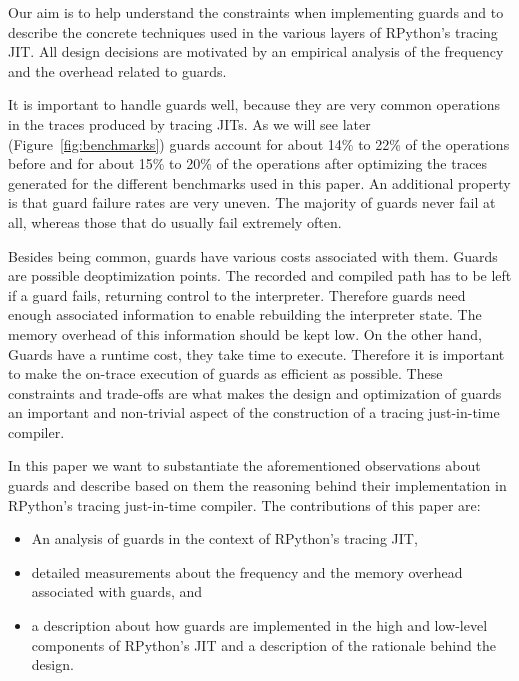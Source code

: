 \documentclass[10pt,preprint]{sigplanconf}
\begin{document}
Our aim is to help understand the constraints when implementing guards
and to describe the concrete techniques used in the various layers of RPython's
tracing JIT. All design decisions are motivated by an empirical analysis of the
frequency and the overhead related to guards.

It is important to handle guards well, because they are very common operations
in the traces produced by tracing JITs. As we will see later (Figure~\ref{fig:benchmarks})
guards account for about 14\% to 22\% of the
operations before and for about 15\% to 20\% of the operations after optimizing
the traces generated for the different benchmarks used in this paper. An
additional property is that guard failure rates are very uneven. The majority
of guards never fail at all, whereas those that do usually fail extremely
often.

Besides being common, guards have various costs associated with them.
Guards are possible deoptimization points. The recorded and
compiled path has to be left if a guard fails, returning control to the
interpreter. Therefore guards need enough associated information to enable
rebuilding the interpreter state. The memory overhead of this information
should be kept low. On the other hand,
Guards have a runtime cost, they take time to execute. Therefore it is
important to make the on-trace execution of guards as efficient as possible.
These constraints and trade-offs are what makes the design
and optimization of guards an important and non-trivial aspect of the construction
of a tracing just-in-time compiler.


In this paper we want to substantiate the aforementioned observations about guards and
describe based on them the reasoning behind their implementation in
RPython's tracing just-in-time compiler. The contributions of this paper are:
\begin{itemize}
  \item An analysis of guards in the context of RPython's tracing JIT,
  \item detailed measurements about the frequency and the
  memory overhead associated with guards, and
  \item a description about how guards are implemented in the high\-
  and low-level components of RPython's JIT and a description of the rationale behind the design.
\end{itemize}
\end{document}
